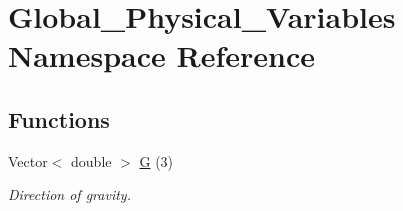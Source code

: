 \hypertarget{namespaceGlobal__Physical__Variables}{}\section{Global\+\_\+\+Physical\+\_\+\+Variables Namespace Reference}
\label{namespaceGlobal__Physical__Variables}
\subsection*{Functions}
\begin{DoxyCompactItemize}
\item 
Vector$<$ double $>$ \hyperlink{namespaceGlobal__Physical__Variables_af5ae275cf339105b9a54821c034df470}{G} (3)
\begin{DoxyCompactList}\small\item\em Direction of gravity. \end{DoxyCompactList}\end{DoxyCompactItemize}
